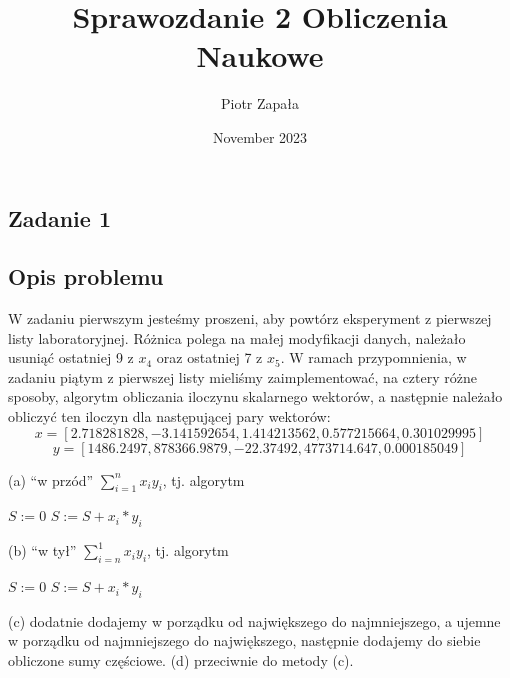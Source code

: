 \documentclass{article}
\title{Sprawozdanie 2 Obliczenia Naukowe}
\author{Piotr Zapała}
\date{November 2023}
\begin{document}
\maketitle
\graphicspath{ {/Users/piotrzapala/JPG}{/Users/piotrzapala/JPG} }

\tableofcontents
\newpage
\begin{center}
    \section{Zadanie 1}
    \subsection{Opis problemu}
    \large W zadaniu pierwszym jesteśmy proszeni, aby powtórz eksperyment z pierwszej listy laboratoryjnej. Różnica polega na małej modyfikacji danych, należało usuniąć ostatniej 9 z \(x_{4}\) oraz ostatniej 7 z \(x_{5}\).
     W ramach przypomnienia, w zadaniu piątym z pierwszej listy mieliśmy zaimplementować, na cztery różne sposoby, algorytm obliczania iloczynu skalarnego 
     wektorów, a następnie należało obliczyć ten iloczyn dla następującej pary wektorów:
    \[\displaystyle x = [2.718281828, -3.141592654, 1.414213562, 0.577215664, 0.301029995]\]
    \[\displaystyle y = [1486.2497, 878366.9879, -22.37492, 4773714.647, 0.000185049]\]
    \begin{flushleft}
       \vspace*{1cm}
       (a) ``w przód'' \(\textstyle \sum_{i=1}^n x_{i}y_{i}\), tj. algorytm
       \begin{algorithmic}
       \State$S:=0$
           \State $S:=S+x_{i}*y_{i}$
       \EndFor
       \end{algorithmic}
       \vspace*{1cm}
       (b) ``w tył'' \(\textstyle \sum_{i=n}^1 x_{i}y_{i}\), tj. algorytm
       \begin{algorithmic}
           \State$S:=0$
               \State $S:=S+x_{i}*y_{i}$
           \EndFor
           \end{algorithmic}
       \vspace*{1cm}
       (c) dodatnie dodajemy w porządku od największego do najmniejszego, a ujemne w porządku od najmniejszego do największego,
       następnie dodajemy do siebie obliczone sumy częściowe.\newline
       (d) przeciwnie do metody (c). 
    \end{flushleft}

\end{center}
\end{document}
